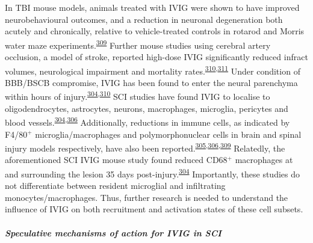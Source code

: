 \documentclass[
]{article}
\begin{document}
In TBI mouse models, animals treated with IVIG were shown to have improved neurobehavioural outcomes, and a reduction in neuronal degeneration both acutely and chronically, relative to vehicle-treated controls in rotarod and Morris water maze experiments.\textsuperscript{\protect\hyperlink{ref-jeong_intravenous_2014}{309}}
Further mouse studies using cerebral artery occlusion, a model of stroke, reported high-dose IVIG significantly reduced infract volumes, neurological impairment and mortality rates.\textsuperscript{\protect\hyperlink{ref-arumugam_intravenous_2007}{310},\protect\hyperlink{ref-widiapradja_intravenous_2012}{311}}
Under condition of BBB/BSCB compromise, IVIG has been found to enter the neural parenchyma within hours of injury.\textsuperscript{\protect\hyperlink{ref-brennan_ivig_2016}{304},\protect\hyperlink{ref-arumugam_intravenous_2007}{310}}
SCI studies have found IVIG to localise to oligodendrocytes, astrocytes, neurons, macrophages, microglia, pericytes and blood vessels.\textsuperscript{\protect\hyperlink{ref-brennan_ivig_2016}{304},\protect\hyperlink{ref-chio_effects_2019}{306}}
Additionally, reductions in immune cells, as indicated by F4/80\(^+\) microglia/macrophages and polymorphonuclear cells in brain and spinal injury models respectively, have also been reported.\textsuperscript{\protect\hyperlink{ref-nguyen_immunoglobulin_2012}{305},\protect\hyperlink{ref-chio_effects_2019}{306},\protect\hyperlink{ref-jeong_intravenous_2014}{309}}
Relatedly, the aforementioned SCI IVIG mouse study found reduced CD68\(^+\) macrophages at and surrounding the lesion 35 days post-injury.\textsuperscript{\protect\hyperlink{ref-brennan_ivig_2016}{304}}
Importantly, these studies do not differentiate between resident microglial and infiltrating monocytes/macrophages.
Thus, further research is needed to understand the influence of IVIG on both recruitment and activation states of these cell subsets.

\hypertarget{speculative-mechanisms-of-action-for-ivig-in-sci}{%
\subparagraph{Speculative mechanisms of action for IVIG in SCI}\label{speculative-mechanisms-of-action-for-ivig-in-sci}}
\end{document}
